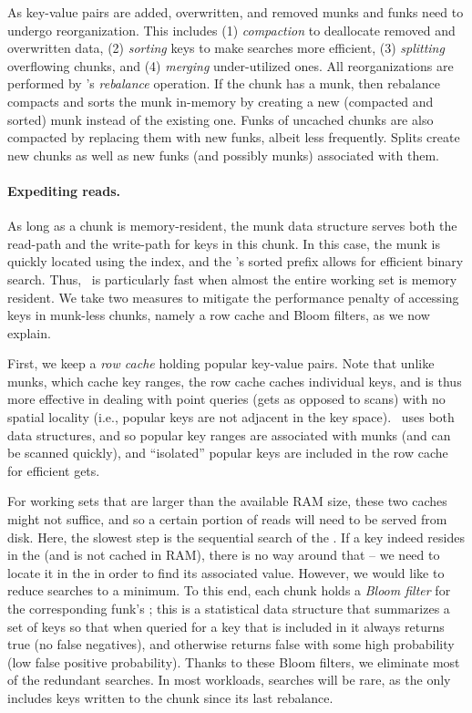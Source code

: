 As key-value pairs are added, overwritten, and removed munks and funks need to undergo reorganization. This includes  
(1) \emph{compaction} to deallocate removed and overwritten data, 
(2) \emph{sorting} keys to make searches more efficient,  
(3) \emph{splitting} overflowing chunks, and
(4) \emph{merging} under-utilized ones.
All reorganizations are performed by \sys's \emph{rebalance} operation.
If the chunk has a munk, then rebalance compacts and sorts the munk in-memory by creating a new 
(compacted and sorted) munk instead of the existing one. 
Funks of uncached chunks are also compacted by replacing them with new funks, albeit less frequently.
Splits  create new chunks as well as new  funks (and possibly munks) associated with them.

\paragraph{Expediting reads.}
As long as a chunk  is memory-resident, the munk data structure serves both the read-path and the write-path for keys in this chunk. 
In this case, the munk is quickly located using the index, and the  's sorted prefix allows for efficient binary search.
Thus, \sys\ is particularly fast when almost the entire working set is memory resident. 
We take two measures to mitigate the performance penalty of accessing keys in munk-less   chunks, namely 
a row cache and Bloom filters, as we now explain.

First, we keep a \emph{row cache} holding popular key-value pairs. Note that unlike munks, which cache key ranges, the row
cache caches individual keys, and is thus more effective in dealing with point queries (gets as opposed to scans) with no
spatial locality (i.e., popular keys are not adjacent in the key space). \sys\ uses both data structures, and so 
popular key ranges are associated with munks (and can be scanned quickly), 
and  ``isolated'' popular keys are included in the row cache for efficient gets.

For working sets that are  larger than the available RAM size, these two caches might not suffice, and so a certain portion of reads will need to be served from disk. Here, the slowest step is the sequential search of the . 
If a key indeed resides in the 
 (and is not cached in RAM), there is no way around that -- we need to locate it in the  in order to find 
its associated value. However, we would like to reduce  searches to a minimum. 
To this end, each chunk holds a \emph{Bloom filter} for the corresponding funk's ; 
this is a statistical data structure that summarizes a set of keys so that 
when queried for a key that is included in it always returns true (no false negatives), 
and otherwise returns false with some high probability (low false positive probability). 
Thanks to these Bloom filters, we eliminate most of the redundant   searches.
In most workloads,   searches will be rare, as the   only includes keys written to the chunk 
since its last rebalance.

